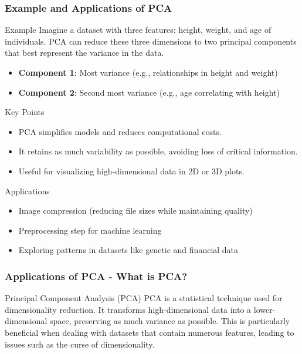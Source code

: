\documentclass[aspectratio=169]{beamer}
\begin{document}
\begin{frame}[fragile]
  \frametitle{Example and Applications of PCA}
  \begin{block}{Example}
    Imagine a dataset with three features: height, weight, and age of individuals. PCA can reduce these three dimensions to two principal components that best represent the variance in the data.
    \begin{itemize}
      \item \textbf{Component 1}: Most variance (e.g., relationships in height and weight)
      \item \textbf{Component 2}: Second most variance (e.g., age correlating with height)
    \end{itemize}
  \end{block}
  
  \begin{block}{Key Points}
    \begin{itemize}
      \item PCA simplifies models and reduces computational costs.
      \item It retains as much variability as possible, avoiding loss of critical information.
      \item Useful for visualizing high-dimensional data in 2D or 3D plots.
    \end{itemize}
  \end{block}
  
  \begin{block}{Applications}
    \begin{itemize}
      \item Image compression (reducing file sizes while maintaining quality)
      \item Preprocessing step for machine learning
      \item Exploring patterns in datasets like genetic and financial data
    \end{itemize}
  \end{block}
\end{frame}

\begin{frame}[fragile]
    \frametitle{Applications of PCA - What is PCA?}
    \begin{block}{Principal Component Analysis (PCA)}
        PCA is a statistical technique used for dimensionality reduction. It transforms high-dimensional data into a lower-dimensional space, preserving as much variance as possible. This is particularly beneficial when dealing with datasets that contain numerous features, leading to issues such as the curse of dimensionality.
    \end{block}
\end{frame}
\end{document}
